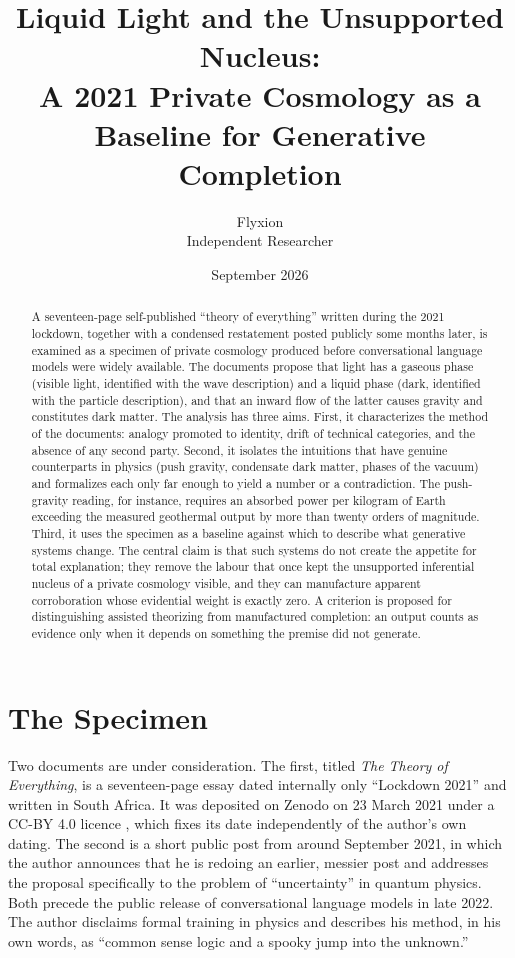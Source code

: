 \documentclass[11pt]{article}
\title{Liquid Light and the Unsupported Nucleus:\\
\large A 2021 Private Cosmology as a Baseline for Generative Completion}
\author{Flyxion\\ \small Independent Researcher}
\date{September 2026}
\begin{document}
\maketitle

\begin{abstract}
A seventeen-page self-published ``theory of everything'' written during the 2021 lockdown, together with a condensed restatement posted publicly some months later, is examined as a specimen of private cosmology produced before conversational language models were widely available. The documents propose that light has a gaseous phase (visible light, identified with the wave description) and a liquid phase (dark, identified with the particle description), and that an inward flow of the latter causes gravity and constitutes dark matter. The analysis has three aims. First, it characterizes the method of the documents: analogy promoted to identity, drift of technical categories, and the absence of any second party. Second, it isolates the intuitions that have genuine counterparts in physics (push gravity, condensate dark matter, phases of the vacuum) and formalizes each only far enough to yield a number or a contradiction. The push-gravity reading, for instance, requires an absorbed power per kilogram of Earth exceeding the measured geothermal output by more than twenty orders of magnitude. Third, it uses the specimen as a baseline against which to describe what generative systems change. The central claim is that such systems do not create the appetite for total explanation; they remove the labour that once kept the unsupported inferential nucleus of a private cosmology visible, and they can manufacture apparent corroboration whose evidential weight is exactly zero. A criterion is proposed for distinguishing assisted theorizing from manufactured completion: an output counts as evidence only when it depends on something the premise did not generate.
\end{abstract}

\section{The Specimen}

Two documents are under consideration. The first, titled \emph{The Theory of Everything}, is a seventeen-page essay dated internally only ``Lockdown 2021'' and written in South Africa. It was deposited on Zenodo on 23 March 2021 under a CC-BY 4.0 licence \cite{orkadmon2021}, which fixes its date independently of the author's own dating. The second is a short public post from around September 2021, in which the author announces that he is redoing an earlier, messier post and addresses the proposal specifically to the problem of ``uncertainty'' in quantum physics. Both precede the public release of conversational language models in late 2022. The author disclaims formal training in physics and describes his method, in his own words, as ``common sense logic and a spooky jump into the unknown.''
\end{document}
